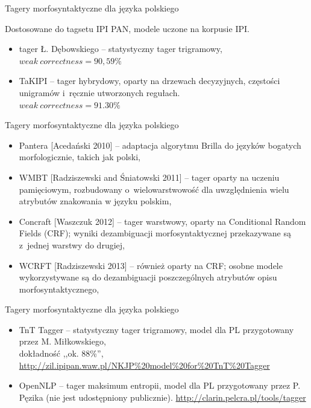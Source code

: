 \documentclass[xcolor=dvipsnames,polish]{beamer}
\begin{document}
\begin{frame}{Tagery morfosyntaktyczne dla języka polskiego}
\vspace{0.5cm}

Dostosowane do tagsetu IPI PAN, modele uczone na korpusie IPI.
\begin{itemize}
\item tager Ł. Dębowskiego -- statystyczny tager trigramowy,\\
$weak\ correctness = 90,59\%$
\item TaKIPI -- tager hybrydowy, oparty na drzewach decyzyjnych, częstości unigramów i~ręcznie utworzonych regułach.\\
$weak\ correctness = 91.30\%$
\end{itemize}
\end{frame}

\begin{frame}{Tagery morfosyntaktyczne dla języka polskiego}
\begin{itemize}
\item Pantera [Acedański 2010] -- adaptacja algorytmu Brilla do języków bogatych morfologicznie, takich jak polski,
\item WMBT [Radziszewski and Śniatowski 2011] -- tager oparty na uczeniu pamięciowym, rozbudowany o~wielowarstwowość dla uwzględnienia wielu atrybutów znakowania w języku polskim,
\item Concraft [Waszczuk 2012] -- tager warstwowy, oparty na Conditional Random Fields (CRF); wyniki dezambiguacji morfosyntaktycznej przekazywane są z~jednej warstwy do drugiej,
\item WCRFT [Radziszewski 2013] -- również oparty na CRF; osobne modele wykorzystywane są do dezambiguacji poszczególnych atrybutów opisu morfosyntaktycznego,
\end{itemize}
\end{frame}

\begin{frame}{Tagery morfosyntaktyczne dla języka polskiego}
\begin{itemize}
\item TnT Tagger -- statystyczny tager trigramowy, model dla PL przygotowany przez M. Miłkowskiego,\\
dokładność ,,ok. 88\%'',\\
{\footnotesize \url{http://zil.ipipan.waw.pl/NKJP\%20model\%20for\%20TnT\%20Tagger}}
\item OpenNLP -- tager maksimum entropii, model dla PL przygotowany przez P. Pęzika (nie jest udostępniony publicznie).
{\footnotesize \url{http://clarin.pelcra.pl/tools/tagger}}
\end{itemize}
\end{frame}
\end{document}
